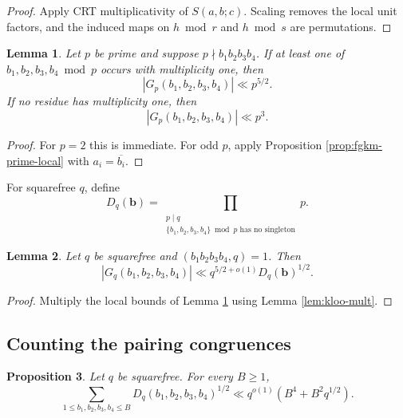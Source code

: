 \documentclass[12pt, a4paper]{amsart}
\numberwithin{equation}{section}
\renewcommand{\le}{\leqslant}
\renewcommand{\ge}{\geqslant}
\theoremstyle{plain}
\newtheorem{lem}{Lemma}[section]
\newtheorem{prop}[lem]{Proposition}
\begin{document}
\begin{proof}
Apply CRT multiplicativity of $S(a,b;c)$. Scaling removes the local unit factors, and the induced maps on $h\bmod r$ and $h\bmod s$ are permutations.
\end{proof}

\begin{lem}\label{lem:prime-local}
Let $p$ be prime and suppose $p\nmid b_1b_2b_3b_4$. If at least one of $b_1,b_2,b_3,b_4\bmod p$ occurs with multiplicity one, then
$$
|G_p(b_1,b_2,b_3,b_4)|\ll p^{5/2}.
$$
If no residue has multiplicity one, then
$$
|G_p(b_1,b_2,b_3,b_4)|\ll p^3.
$$
\end{lem}

\begin{proof}
For $p=2$ this is immediate. For odd $p$, apply Proposition \ref{prop:fgkm-prime-local} with $a_i=\overline{b_i}$.
\end{proof}

For squarefree $q$, define
$$
D_q(\mathbf b)=
\prod_{\substack{p\mid q\\
\{b_1,b_2,b_3,b_4\}\bmod p\text{ has no singleton}}}p.
$$

\begin{lem}\label{lem:sqfree-pointwise}
Let $q$ be squarefree and $(b_1b_2b_3b_4,q)=1$. Then
$$
|G_q(b_1,b_2,b_3,b_4)|
\ll q^{5/2+o(1)}D_q(\mathbf b)^{1/2}.
$$
\end{lem}

\begin{proof}
Multiply the local bounds of Lemma \ref{lem:prime-local} using Lemma \ref{lem:kloo-mult}.
\end{proof}

\subsection{Counting the pairing congruences}

\begin{prop}\label{prop:D-count}
Let $q$ be squarefree. For every $B\ge1$,
$$
\sum_{1\le b_1,b_2,b_3,b_4\le B}D_q(b_1,b_2,b_3,b_4)^{1/2}
\ll q^{o(1)}(B^4+B^2q^{1/2}).
$$
\end{prop}
\end{document}
